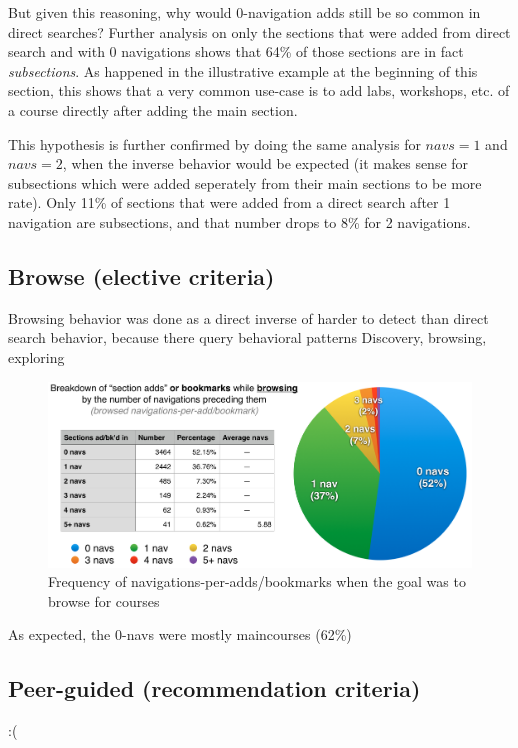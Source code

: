   But given this reasoning, why would 0-navigation adds still be so common in direct searches? Further analysis on only the sections that were added from direct search and with 0 navigations shows that 64\% of those sections are in fact \emph{subsections}. As happened in the illustrative example at the beginning of this section, this shows that a very common use-case is to add labs, workshops, etc. of a course directly after adding the main section.

  This hypothesis is further confirmed by doing the same analysis for ${navs}=1$ and ${navs}=2$, when the inverse behavior would be expected (it makes sense for subsections which were added seperately from their main sections to be more rate). Only 11\% of sections that were added from a direct search after 1 navigation are subsections, and that number drops to 8\% for 2 navigations.

\subsection{Browse (elective criteria)}

  Browsing behavior was done as a direct inverse of  harder to detect than direct search behavior, because there  query behavioral patterns
  Discovery, browsing, exploring

  \begin{figure}
    \centering
    \includegraphics[width=1.0\textwidth]{images/graph/browsed_navs}

    \caption{Frequency of navigations-per-adds/bookmarks when the goal was to browse for courses}
    \label{fig:searchtypes}
  \end{figure}

  As expected, the 0-navs were mostly maincourses (62\%)

\subsection{Peer-guided (recommendation criteria)}

  :(